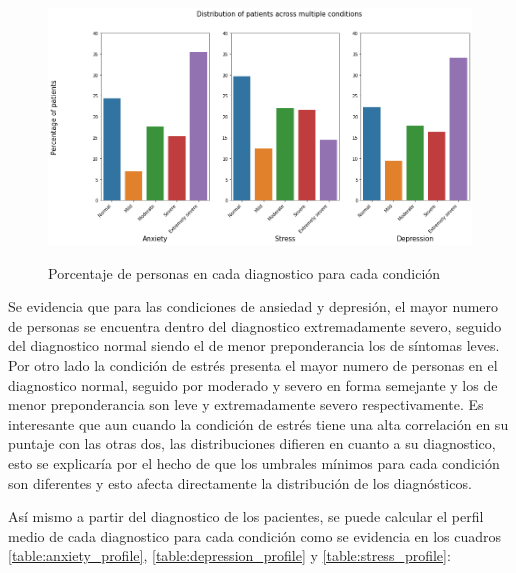 \begin{figure}[h]
\caption{Porcentaje de personas en cada diagnostico para cada condición}
\centering
\includegraphics[scale = 0.5]{Media/Pictures/Distribution of patients across multiple conditions.png} 
\label{figure:distribution}
\end{figure}

 Se evidencia que para las condiciones de ansiedad y depresión, el mayor numero de personas se encuentra dentro del diagnostico extremadamente severo, seguido del diagnostico normal siendo el de menor preponderancia los de síntomas leves. Por otro lado la condición de estrés presenta el mayor numero de personas en el diagnostico normal, seguido por moderado y severo en forma semejante y los de menor preponderancia son leve y extremadamente severo respectivamente. Es interesante que aun cuando la condición de estrés tiene una alta correlación en su puntaje con las otras dos, las distribuciones difieren en cuanto a su diagnostico, esto se explicaría por el hecho de que los umbrales mínimos para cada condición son diferentes y esto afecta directamente la distribución de los diagnósticos. 
 \medbreak
 
Así mismo a partir del diagnostico de los pacientes, se puede calcular el perfil medio de cada diagnostico para cada condición como se evidencia en los cuadros  \ref{table:anxiety_profile}, \ref{table:depression_profile} y \ref{table:stress_profile}:
 
 


